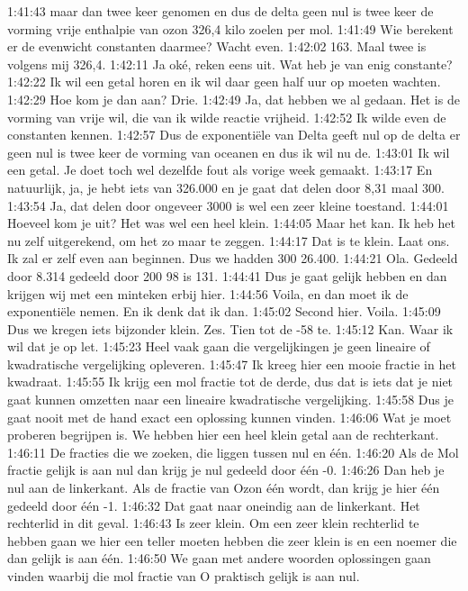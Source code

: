 1:41:43
maar dan twee keer genomen en dus de delta geen nul is twee keer de vorming vrije enthalpie van ozon 326,4 kilo zoelen per mol.
1:41:49
Wie berekent er de evenwicht constanten daarmee? Wacht even.
1:42:02
163. Maal twee is volgens mij 326,4.
1:42:11
Ja oké, reken eens uit. Wat heb je van enig constante?
1:42:22
Ik wil een getal horen en ik wil daar geen half uur op moeten wachten.
1:42:29
Hoe kom je dan aan? Drie.
1:42:49
Ja, dat hebben we al gedaan. Het is de vorming van vrije wil, die van ik wilde reactie vrijheid.
1:42:52
Ik wilde even de constanten kennen.
1:42:57
Dus de exponentiële van Delta geeft nul op de delta er geen nul is twee keer de vorming van oceanen en dus ik wil nu de.
1:43:01
Ik wil een getal. Je doet toch wel dezelfde fout als vorige week gemaakt.
1:43:17
En natuurlijk, ja, je hebt iets van 326.000 en je gaat dat delen door 8,31 maal 300.
1:43:54
Ja, dat delen door ongeveer 3000 is wel een zeer kleine toestand.
1:44:01
Hoeveel kom je uit? Het was wel een heel klein.
1:44:05
Maar het kan. Ik heb het nu zelf uitgerekend, om het zo maar te zeggen.
1:44:17
Dat is te klein. Laat ons. Ik zal er zelf even aan beginnen. Dus we hadden 300 26.400.
1:44:21
Ola. Gedeeld door 8.314 gedeeld door 200 98 is 131.
1:44:41
Dus je gaat gelijk hebben en dan krijgen wij met een minteken erbij hier.
1:44:56
Voila, en dan moet ik de exponentiële nemen. En ik denk dat ik dan.
1:45:02
Second hier. Voila.
1:45:09
Dus we kregen iets bijzonder klein. Zes. Tien tot de -58 te.
1:45:12
Kan. Waar ik wil dat je op let.
1:45:23
Heel vaak gaan die vergelijkingen je geen lineaire of kwadratische vergelijking opleveren.
1:45:47
Ik kreeg hier een mooie fractie in het kwadraat.
1:45:55
Ik krijg een mol fractie tot de derde, dus dat is iets dat je niet gaat kunnen omzetten naar een lineaire kwadratische vergelijking.
1:45:58
Dus je gaat nooit met de hand exact een oplossing kunnen vinden.
1:46:06
Wat je moet proberen begrijpen is. We hebben hier een heel klein getal aan de rechterkant.
1:46:11
De fracties die we zoeken, die liggen tussen nul en één.
1:46:20
Als de Mol fractie gelijk is aan nul dan krijg je nul gedeeld door één -0.
1:46:26
Dan heb je nul aan de linkerkant. Als de fractie van Ozon één wordt, dan krijg je hier één gedeeld door één -1.
1:46:32
Dat gaat naar oneindig aan de linkerkant. Het rechterlid in dit geval.
1:46:43
Is zeer klein. Om een zeer klein rechterlid te hebben gaan we hier een teller moeten hebben die zeer klein is en een noemer die dan gelijk is aan één.
1:46:50
We gaan met andere woorden oplossingen gaan vinden waarbij die mol fractie van O praktisch gelijk is aan nul.
